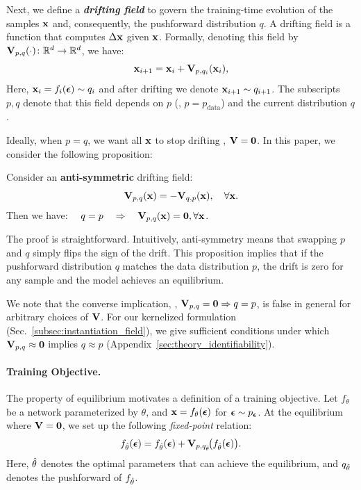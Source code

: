 Next, we define a \emph{\textbf{drifting field}} to govern the training-time evolution of the samples $\mathbf{x}$ and, consequently, the pushforward distribution $q$.
A drifting field is a function that computes $ \Delta\mathbf{x}$ given $\mathbf{x}$. Formally, denoting this field by $\mathbf{V}_{p,q}(\cdot)\colon \mathbb{R}^d \to \mathbb{R}^d$, we have: 
\begin{equation}
\mathbf{x}_{i+1}=\mathbf{x}_i+\mathbf{V}_{p,q_i}(\mathbf{x}_i),
\end{equation}
Here, $\mathbf{x}_i=f_i({\boldsymbol{\epsilon}}) \sim q_i$ and after drifting we denote $\mathbf{x}_{i+1}\sim q_{i+1}$.
The subscripts $p,q$ denote that this field depends on $p$ (\eg, $p=p_\text{data}$) and the current distribution $q$.

Ideally, when $p=q$, we want all $\mathbf{x}$ to stop drifting \ie, $\mathbf{V}=\textbf{0}$.
In this paper, we consider the following proposition:
\begin{proposition}
Consider an \textbf{anti-symmetric} drifting field:
\begin{equation}
\label{eq:asym}
\mathbf{V}_{p,q}(\mathbf{x}) = - \mathbf{V}_{q,p}(\mathbf{x}),\quad \forall \mathbf{x}.
\end{equation}
Then we have: $\quad q=p \quad \Rightarrow \quad \mathbf{V}_{p,q}(\mathbf{x}) = \mathbf{0},\forall \mathbf{x}$.
\end{proposition}

The proof is straightforward\footnotemark.
Intuitively, anti-symmetry means that swapping $p$ and $q$ simply flips the sign of the drift.
This proposition implies that if the pushforward distribution $q$ matches the data distribution $p$, the drift is zero for any sample and the model achieves an equilibrium.


We note that the converse implication, \ie, $\mathbf{V}_{p,q}=\mathbf{0}\Rightarrow q=p$, is false in general for arbitrary choices of $\mathbf{V}$.
For our kernelized formulation (Sec.~\ref{subsec:instantiation_field}), we give sufficient conditions under which $\mathbf{V}_{p,q}\approx\mathbf{0}$ implies $q\approx p$ (Appendix~\ref{sec:theory_identifiability}).



\paragraph{Training Objective.}
The property of equilibrium motivates a definition of a training objective.
Let $f_\theta$ be a network parameterized by $\theta$, and $\mathbf{x} = f_\theta({\boldsymbol{\epsilon}})$ for ${\boldsymbol{\epsilon}} \sim p_{\boldsymbol{\epsilon}}$. At the equilibrium where $\mathbf{V}=\textbf{0}$, we set up the following \textit{fixed-point} relation:
\begin{equation}
\label{eq:eq_cond}
f_{{\hat{\theta}}}({\boldsymbol{\epsilon}})
=
f_{{\hat{\theta}}}({\boldsymbol{\epsilon}})
+
\mathbf{V}_{p,q_{{\hat{\theta}}}}\!\big(f_{{\hat{\theta}}}({\boldsymbol{\epsilon}})\big).
\end{equation}
Here, ${\hat{\theta}}$ denotes the optimal parameters that can achieve the equilibrium, and $q_{\hat{\theta}}$ denotes the pushforward of $f_{{\hat{\theta}}}$.

